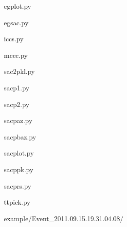 \documentclass[12pt, titlepage]{article}
\newenvironment{lyxcode}
{\begin{list}{}{
\setlength{\rightmargin}{\leftmargin}
\setlength{\listparindent}{0pt}%
\raggedright
\setlength{\itemsep}{0pt}
\setlength{\parsep}{0pt}
\normalfont\ttfamily}%
 \item[]}
{\end{list}}
\begin{document}
\begin{multicols}{2}
\begin{spacing}{1}
\begin{lyxcode}
\hspace{2em} egplot.py

\hspace{2em} egsac.py

\hspace{2em} iccs.py

\hspace{2em} mccc.py

\hspace{2em} sac2pkl.py

\hspace{2em} sacp1.py

\hspace{2em} sacp2.py

\hspace{2em} sacpaz.py

\hspace{2em} sacpbaz.py

\hspace{2em} sacplot.py

\hspace{2em} sacppk.py

\hspace{2em} sacprs.py

\hspace{2em} ttpick.py






example/Event\_2011.09.15.19.31.04.08/


\end{lyxcode}


\end{spacing}
\end{multicols}




%
%
%
% 

\newpage




    
\end{document}
